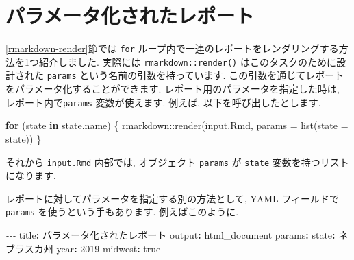 \documentclass[
  11pt,
  lualatex,
  ja=standard]{bxjsreport}
\newenvironment{Shaded}{\begin{snugshade}}{\end{snugshade}}
\newcommand{\AnnotationTok}[1]{\textcolor[rgb]{0.56,0.35,0.01}{\textbf{\textit{#1}}}}
\newcommand{\AttributeTok}[1]{\textcolor[rgb]{0.77,0.63,0.00}{#1}}
\newcommand{\CharTok}[1]{\textcolor[rgb]{0.31,0.60,0.02}{#1}}
\newcommand{\CommentTok}[1]{\textcolor[rgb]{0.56,0.35,0.01}{\textit{#1}}}
\newcommand{\ControlFlowTok}[1]{\textcolor[rgb]{0.13,0.29,0.53}{\textbf{#1}}}
\newcommand{\DecValTok}[1]{\textcolor[rgb]{0.00,0.00,0.81}{#1}}
\newcommand{\FunctionTok}[1]{\textcolor[rgb]{0.00,0.00,0.00}{#1}}
\newcommand{\InformationTok}[1]{\textcolor[rgb]{0.56,0.35,0.01}{\textbf{\textit{#1}}}}
\newcommand{\KeywordTok}[1]{\textcolor[rgb]{0.13,0.29,0.53}{\textbf{#1}}}
\newcommand{\NormalTok}[1]{#1}
\newcommand{\PreprocessorTok}[1]{\textcolor[rgb]{0.56,0.35,0.01}{\textit{#1}}}
\newcommand{\SpecialCharTok}[1]{\textcolor[rgb]{0.00,0.00,0.00}{#1}}
\newcommand{\StringTok}[1]{\textcolor[rgb]{0.31,0.60,0.02}{#1}}
\begin{document}
\hypertarget{parameterized-reports}{%
\section{パラメータ化されたレポート}\label{parameterized-reports}}

\ref{rmarkdown-render}節では \texttt{for} ループ内で一連のレポートをレンダリングする方法を1つ紹介しました. 実際には \texttt{rmarkdown::render()} はこのタスクのために設計された \texttt{params} という名前の引数を持っています. この引数を通じてレポートをパラメータ化することができます. レポート用のパラメータを指定した時は, レポート内で\texttt{params} 変数が使えます. 例えば, 以下を呼び出したとします.

\begin{Shaded}
\begin{Highlighting}[numbers=left,,]
\ControlFlowTok{for}\NormalTok{ (state }\ControlFlowTok{in}\NormalTok{ state.name) \{}
\NormalTok{  rmarkdown}\SpecialCharTok{::}\FunctionTok{render}\NormalTok{(}\StringTok{\textquotesingle{}input.Rmd\textquotesingle{}}\NormalTok{, }\AttributeTok{params =} \FunctionTok{list}\NormalTok{(}\AttributeTok{state =}\NormalTok{ state))}
\NormalTok{\}}
\end{Highlighting}
\end{Shaded}

それから \texttt{input.Rmd} 内部では, オブジェクト \texttt{params} が \texttt{state} 変数を持つリストになります.

\begin{Shaded}
\end{Shaded}

レポートに対してパラメータを指定する別の方法として, YAML フィールドで \texttt{params} を使うという手もあります. 例えばこのように.

\begin{Shaded}
\begin{Highlighting}[]
\PreprocessorTok{{-}{-}{-}}
\FunctionTok{title}\KeywordTok{:}\AttributeTok{ パラメータ化されたレポート}
\FunctionTok{output}\KeywordTok{:}\AttributeTok{ html\_document}
\FunctionTok{params}\KeywordTok{:}
\AttributeTok{  }\FunctionTok{state}\KeywordTok{:}\AttributeTok{ ネブラスカ州}
\AttributeTok{  }\FunctionTok{year}\KeywordTok{:}\AttributeTok{ }\DecValTok{2019}
\AttributeTok{  }\FunctionTok{midwest}\KeywordTok{:}\AttributeTok{ }\CharTok{true}
\PreprocessorTok{{-}{-}{-}}
\end{Highlighting}
\end{Shaded}
\end{document}

